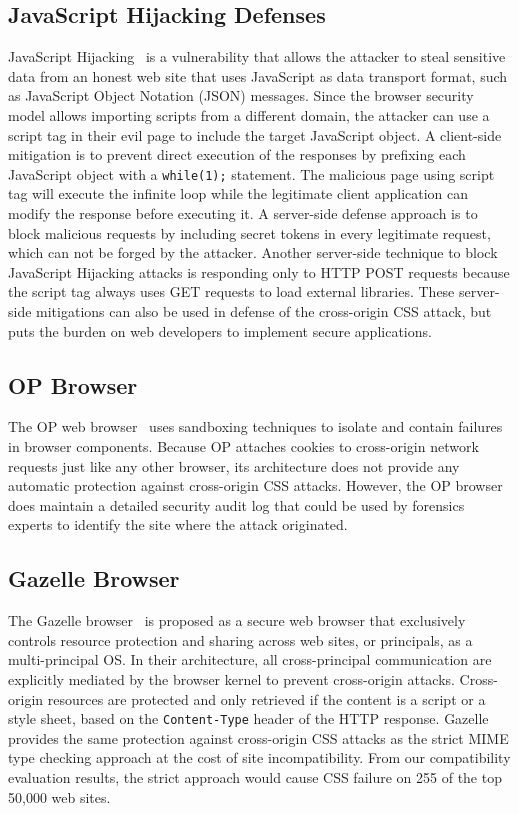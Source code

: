 \documentclass{acm_proc_article-sp}
\begin{document}
\subsection{JavaScript Hijacking Defenses}
JavaScript Hijacking~\cite{jshijacking} is a vulnerability that allows the attacker to steal sensitive data from an honest web site that uses JavaScript as data transport format, such as JavaScript Object Notation (JSON) messages. Since the browser security model allows importing scripts from a different domain, the attacker can use a script tag in their evil page to include the target JavaScript object. A client-side mitigation is to prevent direct execution of the responses by prefixing each JavaScript object with a \texttt{while(1);} statement. The malicious page using script tag will execute the infinite loop while the legitimate client application can modify the response before executing it. A server-side defense approach is to block malicious requests by including secret tokens in every legitimate request, which can not be forged by the attacker. Another server-side technique to block JavaScript Hijacking attacks is responding only to HTTP POST requests because the script tag always uses GET requests to load external libraries. These server-side mitigations can also be used in defense of the cross-origin CSS attack, but puts the burden on web developers to implement secure applications.

\subsection{OP Browser}
The OP web browser~\cite{op-browser} uses sandboxing techniques to isolate and
contain failures in browser components. Because OP attaches cookies to
cross-origin network requests just like any other browser, its architecture
does not provide any automatic protection against cross-origin CSS attacks.
However, the OP browser does maintain a detailed security audit log that could
be used by forensics experts to identify the site where the attack originated.

\subsection{Gazelle Browser}
The Gazelle browser~\cite{gazelle} is proposed as a secure web browser that exclusively controls resource protection and sharing across web sites, or principals, as a multi-principal OS. In their architecture, all cross-principal communication are explicitly mediated by the browser kernel to prevent cross-origin attacks. Cross-origin resources are protected and only retrieved if the content is a script or a style sheet, based on the \texttt{Content-Type} header of the HTTP response. Gazelle provides the same protection against cross-origin CSS attacks as the strict MIME type checking approach at the cost of site incompatibility. From our compatibility evaluation results, the strict approach would cause CSS failure on 255 of the top 50,000 web sites.
\end{document}
